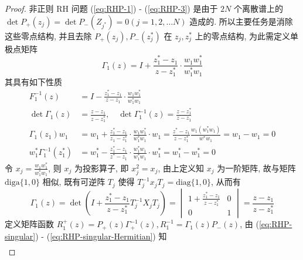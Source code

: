 \begin{proof}
  非正则 RH 问题  (\ref{eq:RHP-1}) - (\ref{eq:RHP-3}) 是由于 $ 2N $ 个离散谱上的 $ \det P_{+}(z_{j}) = \det P_{-}(Z_{j^{*}}) = 0 (j = 1,2, \dots N) $ 造成的. 所以主要任务是消除这些零点结构, 并且去除 $ P_{+}(z_{j}), P_{-}(z_{j}^{*}) $ 在 $ z_{j}, z_{j}^{*} $ 上的零点结构, 为此需定义单极点矩阵
  \begin{equation}
    \Gamma_{1}(z) = I + \frac{z^{*}_{1} - z_{1}}{z - z_{1}^{*}} \cdot \frac{w_{1}w^{*}_{1}}{w^{*}_{1} w_{1}}
  \end{equation}
  其具有如下性质 
  \begin{equation}
    \begin{aligned}
      F_{1}^{-1}(z) &= I - \frac{z_{1}^{*} - z_{1}}{z - z_{1}} \cdot \frac{w_{1}w^{*}_{1}}{w^{*}_{1} w_{1}} \\
      \det \Gamma_{1}(z) &= \frac{z - z_{1}}{z - z_{1}^{*}}, \quad \det \Gamma_{1}^{-1}(z) = \frac{z - z_{1}^{*}}{z - z_{1}} \\
      \Gamma_{1}(z_{1}) w_{1} &= w_{1} + \frac{z^{*}_{1} - z_{1}}{z_{1} - z_{1}^{*}} \cdot \frac{w_{1}w_{1}^{*}}{w^{*}_{1}w_{1}} \cdot w_{1} = \frac{z^{*} - z_{1}}{z - z^{*}_{1}} \frac{w_{1}(w_{1}^{*}w_{1})}{w^{*}w_{1}} = w_{1} - w_{1} = 0 \\
      w_{1}^{*}\Gamma_{1}^{-1}(z^{*}_{1}) &= w_{1}^{*} - \frac{z_{1}^{*} - z_{1}}{z^{*} - z_{1}} \cdot \frac{w_{1}^{*}w_{1}}{w_{1}^{*}w_{1}} \cdot w_{1}^{*} = w_{1}^{*} - w_{1}^{*} = 0
    \end{aligned}
  \end{equation}
  令 $ x_{j} = \frac{w_{1}w_{1}^{*}}{w_{1}^{*}w_{1}} $, 则 $ x_{j} $ 为投影算子, 即 $ x_{j}^{2} = x_{j} $, 由上定义知 $ x_{j} $ 为一阶矩阵, 故与矩阵 $ \text{diga}\{1,0\} $ 相似, 既有可逆阵 $ T_{j} $ 使得 $ T_{j}^{-1} x_{j} T_{j} = \textrm{diag}\{1,0\} $, 从而有
  \begin{equation}
      \Gamma_{1}(z) = \det \left(I + \frac{z_{1}^{*} - z_{1}}{z - z_{1}^{*}} T_{j}^{-1}X_{j}T_{j}\right) = \begin{vmatrix}
      1 + \frac{z_{1}^{*} - z_{1}}{z - z_{1}^{*}} & 0 \\ 0 & 1
      \end{vmatrix} = \frac{z - z_{1}}{z - z^{*}_{1}}
  \end{equation}
  定义矩阵函数 $ R_{1}^{+}(z) = P_{+}(z) \Gamma_{+}^{-1}(z), R_{1}^{-1}= \Gamma_{1}(z) P_{-}(z) $, 由 (\ref{eq:RHP-singular}) - (\ref{eq:RHP-singular-Hermitian}) 知
  \begin{equation}
    \begin{aligned}

\end{aligned}
\end{equation}
\end{proof}
